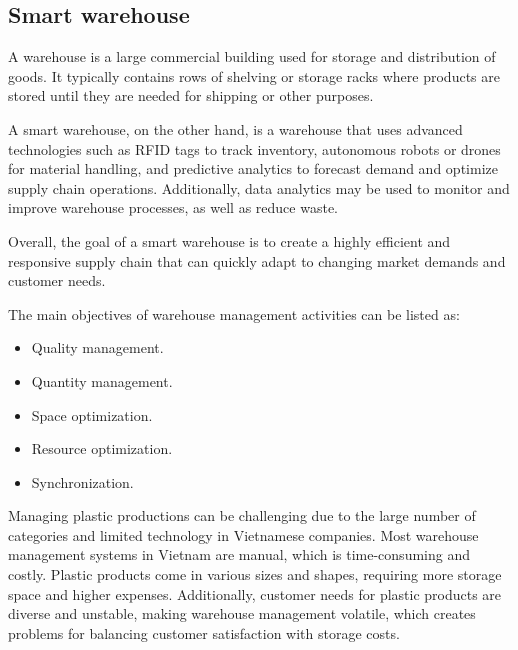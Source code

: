 \subsection{Smart warehouse}

A warehouse is a large commercial building used for storage and distribution of goods. It typically contains rows of shelving or storage racks where products are stored until they are needed for shipping or other purposes. \cite{smith2019warehouse}

A smart warehouse, on the other hand, is a warehouse that uses advanced \linebreak technologies such as RFID tags to track inventory, autonomous robots or drones for material handling, and predictive analytics to forecast demand and optimize supply chain operations. Additionally, data analytics may be used to monitor and improve warehouse processes, as well as reduce waste. \cite{Abhijeet2019}

Overall, the goal of a smart warehouse is to create a highly efficient and \linebreak responsive supply chain that can quickly adapt to changing market demands and customer needs.

The main objectives of warehouse management activities can be listed as:
        \begin{itemize}
            \begin{itemize}
                \item Quality management.
                \item Quantity management.
                \item Space optimization.
                \item Resource optimization.
                \item Synchronization.
            \end{itemize}
        \end{itemize}

Managing plastic productions can be challenging due to the large number of categories and limited technology in Vietnamese companies. Most warehouse \linebreak management systems in Vietnam are manual, which is time-consuming and costly. Plastic products come in various sizes and shapes, requiring more storage space and higher expenses. Additionally, customer needs for plastic products are diverse and unstable, making warehouse management volatile, which creates problems for balancing customer satisfaction with storage costs. \cite{Duong2019}

